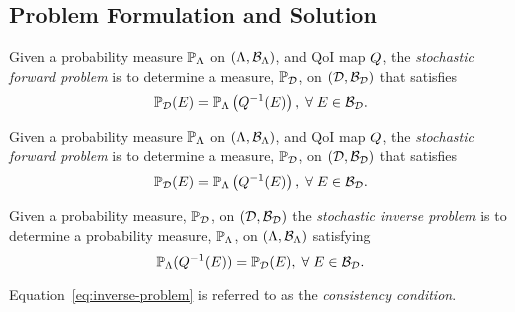 \subsection{Problem Formulation and Solution}
\begin{frame}[t]

\begin{defn}\label{defn:forward-problem}
  Given a probability measure $\mathbb{P}_{\Lambda}$ on $({\Lambda}, \mathcal{B}_{{\Lambda}})$, and QoI map $Q$, the \emph{stochastic forward problem} is to determine a measure, $\mathbb{P}_{\mathcal{D}}$, on $(\mathcal{D}, \mathcal{B}_{\mathcal{D}})$ that satisfies
  \begin{equation}\label{eq:forward-problem}
    \mathbb{P}_{\mathcal{D}} (E) = \mathbb{P}_{\Lambda} \left ( Q^{-1}(E) \right ), \; \forall \; E \in \mathcal{B}_{\mathcal{D}}.
  \end{equation}
\end{defn}

\end{frame}

\begin{frame}[t]

\begin{defn}\label{defn:forward-problem}
  Given a probability measure $\mathbb{P}_{\Lambda}$ on $({\Lambda}, \mathcal{B}_{{\Lambda}})$, and QoI map $Q$, the \emph{stochastic forward problem} is to determine a measure, $\mathbb{P}_{\mathcal{D}}$, on $(\mathcal{D}, \mathcal{B}_{\mathcal{D}})$ that satisfies
  \begin{equation}\label{eq:forward-problem}
    \mathbb{P}_{\mathcal{D}} (E) = \mathbb{P}_{\Lambda} \left ( Q^{-1}(E) \right ), \; \forall \; E \in \mathcal{B}_{\mathcal{D}}.
  \end{equation}
\end{defn}

\begin{defn}\label{defn:inverse-problem}
Given a probability measure, $\mathbb{P}_{\mathcal{D}}$, on $(\mathcal{D}, \mathcal{B}_{\mathcal{D}})$ the \emph{stochastic inverse problem} is to determine a probability measure, $\mathbb{P}_{\Lambda}$, on $({\Lambda}, \mathcal{B}_{{\Lambda}})$ satisfying
\begin{equation}\label{eq:inverse-problem}
\mathbb{P}_{\Lambda} (Q^{-1}(E)) = \mathbb{P}_{\mathcal{D}}(E), \; \forall \; E \in \mathcal{B}_{\mathcal{D}}.
\end{equation}
\end{defn}

Equation~\eqref{eq:inverse-problem} is referred to as the \emph{consistency condition}.

\end{frame}


